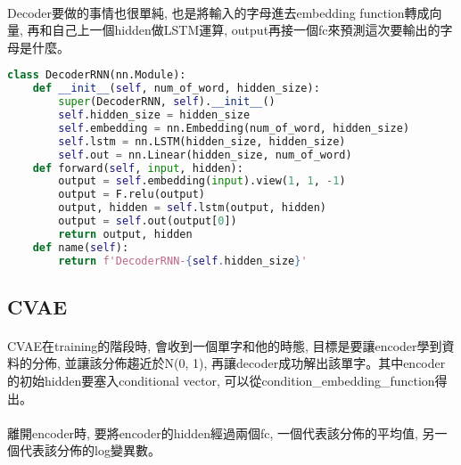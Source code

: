 \paragraph{}
Decoder要做的事情也很單純, 也是將輸入的字母進去embedding function轉成向量, 再和自己上一個hidden做LSTM運算, output再接一個fc來預測這次要輸出的字母是什麼。
\begin{lstlisting}[language=Python]
class DecoderRNN(nn.Module):
    def __init__(self, num_of_word, hidden_size):
        super(DecoderRNN, self).__init__()
        self.hidden_size = hidden_size
        self.embedding = nn.Embedding(num_of_word, hidden_size)
        self.lstm = nn.LSTM(hidden_size, hidden_size)
        self.out = nn.Linear(hidden_size, num_of_word)
    def forward(self, input, hidden):
        output = self.embedding(input).view(1, 1, -1)
        output = F.relu(output)
        output, hidden = self.lstm(output, hidden)
        output = self.out(output[0])
        return output, hidden
    def name(self):
        return f'DecoderRNN-{self.hidden_size}'
\end{lstlisting}
\subsection{CVAE}
\paragraph{}
CVAE在training的階段時, 會收到一個單字和他的時態, 目標是要讓encoder學到資料的分佈, 並讓該分佈趨近於N(0, 1), 再讓decoder成功解出該單字。其中encoder的初始hidden要塞入conditional vector, 可以從condition\_embedding\_function得出。
\paragraph{}
離開encoder時, 要將encoder的hidden經過兩個fc, 一個代表該分佈的平均值, 另一個代表該分佈的log變異數。
